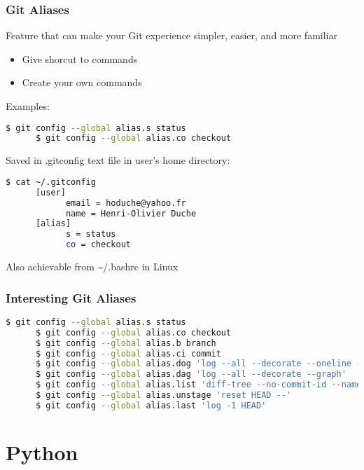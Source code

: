\begin{frame}[fragile]\frametitle{Git Aliases}
   Feature that can make your Git experience simpler, easier, and more familiar
   \begin{itemize}
      \item Give shorcut to commands
      \item Create your own commands
   \end{itemize}
   \vspace{0.5em}
   Examples:
   \begin{lstlisting}[language=bash, style=bash, autogobble]
      $ git config --global alias.s status
      $ git config --global alias.co checkout
   \end{lstlisting}
   Saved in .gitconfig text file in user's home directory:
   \begin{lstlisting}[language=bash, style=bash, autogobble]
      $ cat ~/.gitconfig
      [user]
            email = hoduche@yahoo.fr
            name = Henri-Olivier Duche
      [alias]
            s = status
            co = checkout
   \end{lstlisting}
   Also achievable from \~{}/.bashrc in Linux
\end{frame}

\begin{frame}[fragile]\frametitle{Interesting Git Aliases}
   \begin{lstlisting}[language=bash, style=bash, autogobble]
      $ git config --global alias.s status
      $ git config --global alias.co checkout
      $ git config --global alias.b branch
      $ git config --global alias.ci commit
      $ git config --global alias.dog 'log --all --decorate --oneline --graph'
      $ git config --global alias.dag 'log --all --decorate --graph'
      $ git config --global alias.list 'diff-tree --no-commit-id --name-only -r'
      $ git config --global alias.unstage 'reset HEAD --'
      $ git config --global alias.last 'log -1 HEAD'
   \end{lstlisting}
\end{frame}

\section{Python}



